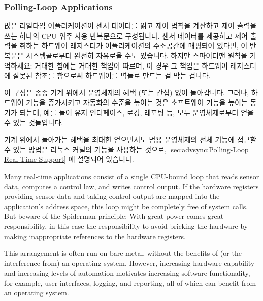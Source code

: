 \subsubsection{Polling-Loop Applications}
\label{sec:advsync:Polling-Loop Applications}

많은 리얼타임 어플리케이션이 센서 데이터를 읽고 제어 법칙을 계산하고 제어
출력을 쓰는 하나의 CPU 위주 사용 반복문으로 구성됩니다.
센서 데이터를 제공하고 제어 출력을 취하는 하드웨어 레지스터가 어플리케이션의
주소공간에 매핑되어 있다면, 이 반복문은 시스템콜로부터 완전히 자유로울 수도
있습니다.
하지만 스파이더맨 원칙을 기억하세요: 거대한 힘에는 거대한 책임이 따르며, 이
경우 그 책임은 하드웨어 레지스터에 잘못된 참조를 함으로써 하드웨어를 벽돌로
만드는 걸 막는 겁니다.

이 구성은 종종 기계 위에서 운영체제의 혜택 (또는 간섭) 없이 돌아갑니다.
그러나, 하드웨어 기능을 증가시키고 자동화의 수준을 높이는 것은 소프트웨어
기능을 높이는 동기가 되는데, 예를 들어 유저 인터페이스, 로깅, 레포팅 등, 모두
운영체제로부터 얻을 수 있는 것들입니다.

기계 위에서 돌아가는 혜택을 최대한 얻으면서도 범용 운영체제의 전체 기능에
접근할 수 있는 방법은 리눅스 커널의  기능을 사용하는 것으로,
\cref{sec:advsync:Polling-Loop Real-Time Support} 에 설명되어 있습니다.

\iffalse

Many real-time applications consist of a single CPU-bound loop that
reads sensor data, computes a control law, and writes control output.
If the hardware registers providing sensor data and taking control
output are mapped into the application's address space, this loop
might be completely free of system calls.
But beware of the Spiderman principle: With great power comes great
responsibility, in this case the responsibility to avoid bricking the
hardware by making inappropriate references to the hardware registers.

This arrangement is often run on bare metal, without the benefits of
(or the interference from) an operating system.
However, increasing hardware capability and increasing levels of
automation motivates increasing software functionality, for example,
user interfaces, logging, and reporting, all of which can benefit from
an operating system.

